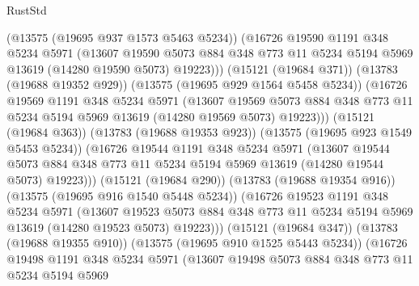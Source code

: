 \begin{lexlean}{RustStd}
\begin{coremodule}
                (@13575 (@19695 @937 @1573 @5463 @5234))
                (@16726
                  @19590
                  @1191
                  @348
                  @5234
                  @5971
                  (@13607
                    @19590
                    @5073
                    @884
                    @348
                    @773
                    @11
                    @5234
                    @5194
                    @5969
                    @13619
                    (@14280 @19590 @5073)
                    @19223)))
              (@15121 (@19684 @371))
              (@13783 (@19688 @19352 @929))
              (@13575 (@19695 @929 @1564 @5458 @5234))
              (@16726
                @19569
                @1191
                @348
                @5234
                @5971
                (@13607
                  @19569
                  @5073
                  @884
                  @348
                  @773
                  @11
                  @5234
                  @5194
                  @5969
                  @13619
                  (@14280 @19569 @5073)
                  @19223)))
            (@15121 (@19684 @363))
            (@13783 (@19688 @19353 @923))
            (@13575 (@19695 @923 @1549 @5453 @5234))
            (@16726
              @19544
              @1191
              @348
              @5234
              @5971
              (@13607
                @19544
                @5073
                @884
                @348
                @773
                @11
                @5234
                @5194
                @5969
                @13619
                (@14280 @19544 @5073)
                @19223)))
          (@15121 (@19684 @290))
          (@13783 (@19688 @19354 @916))
          (@13575 (@19695 @916 @1540 @5448 @5234))
          (@16726
            @19523
            @1191
            @348
            @5234
            @5971
            (@13607
              @19523
              @5073
              @884
              @348
              @773
              @11
              @5234
              @5194
              @5969
              @13619
              (@14280 @19523 @5073)
              @19223)))
        (@15121 (@19684 @347))
        (@13783 (@19688 @19355 @910))
        (@13575 (@19695 @910 @1525 @5443 @5234))
        (@16726
          @19498
          @1191
          @348
          @5234
          @5971
          (@13607
            @19498
            @5073
            @884
            @348
            @773
            @11
            @5234
            @5194
            @5969

\end{coremodule}
\end{lexlean}

